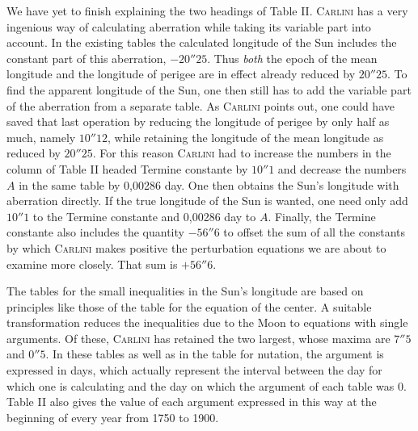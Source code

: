 We have yet to finish explaining the two headings of Table II. \textsc{Carlini} has a very ingenious way of calculating aberration while taking its variable part into account. In the existing tables the calculated longitude of the Sun includes the constant part of this aberration, $-20''25$. Thus \emph{both} the epoch of the mean longitude and the longitude of perigee are in effect already reduced by $20''25$. To find the apparent longitude of the Sun, one then still has to add the variable part of the aberration from a separate table. As \textsc{Carlini} points out, one could have saved that last operation by reducing the longitude of perigee by only half as much, namely $10''12$, while retaining the longitude of the mean longitude as reduced by $20''25$. For this reason \textsc{Carlini} had to increase the numbers in the column of Table II headed Termine constante by $10''1$ and decrease the numbers $A$ in the same table by 0,00286 day. One then obtains the Sun's longitude with aberration directly. If the true longitude of the Sun is wanted, one need only add $10''1$ to the Termine constante and 0,00286 day to $A$. Finally, the Termine constante also includes the quantity $-56''6$ to offset the sum of all the constants by which \textsc{Carlini} makes positive the perturbation equations we are about to examine more closely. That sum is $+56''6$.

The tables for the small inequalities in the Sun's longitude are based on principles like those of the table for the equation of the center. A suitable transformation reduces the inequalities due to the Moon to equations with single arguments. Of these, \textsc{Carlini} has retained the two largest, whose maxima are $7''5$ and $0''5$. In these tables as well as in the table for nutation, the argument is expressed in days, which actually represent the interval between the day for which one is calculating and the day on which the argument of each table was 0. Table II also gives the value of each argument expressed in this way at the beginning of every year from 1750 to 1900.

